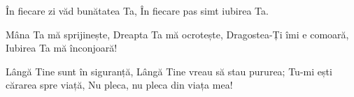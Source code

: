 \beginverse
În fiecare zi văd bunătatea Ta,
În fiecare pas simt iubirea Ta.
\endverse

\beginchorus
Mâna Ta mă sprijinește,
Dreapta Ta mă ocrotește,
Dragostea-Ți îmi e comoară,
Iubirea Ta mă înconjoară!
\endchorus

\beginverse*
Lângă Tine sunt în siguranță,
Lângă Tine vreau să stau pururea;
Tu-mi ești cărarea spre viață,
Nu pleca, nu pleca din viața mea!
\endverse
\endsong